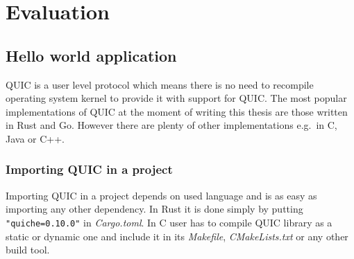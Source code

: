 

\section{Evaluation}
\label{sec:evaluation}


\subsection{Hello world application}
\label{subsec:hellow-world-application}
QUIC is a user level protocol which means there is no need to recompile operating system kernel to provide it with support
for QUIC\@.
The most popular implementations of QUIC at the moment of writing this thesis are those written in Rust and Go.
However there are plenty of other implementations e.g.\ in C, Java or C++.

\subsubsection{Importing QUIC in a project}
Importing QUIC in a project depends on used language and is as easy as importing any other dependency.
In Rust it is done simply by putting \lstinline{"quiche=0.10.0"} in \textit{Cargo.toml}.
In C user has to compile QUIC library as a static or dynamic one and include it in its \textit{Makefile}, \textit{CMakeLists.txt}
or any other build tool.

